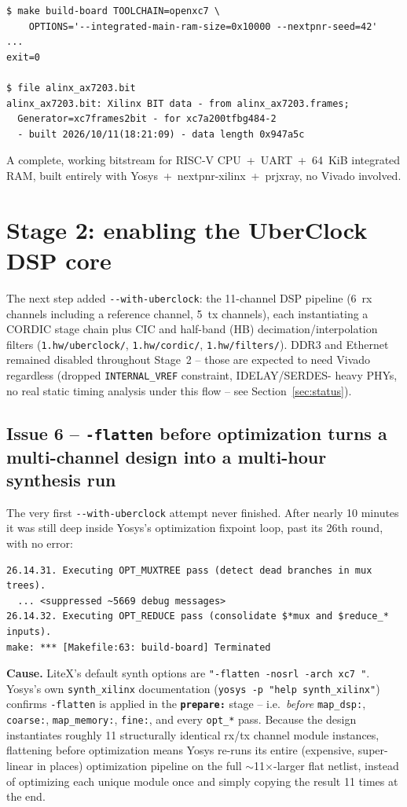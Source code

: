 \documentclass[11pt]{article}
\begin{document}
\begin{lstlisting}[style=termout]
$ make build-board TOOLCHAIN=openxc7 \
    OPTIONS='--integrated-main-ram-size=0x10000 --nextpnr-seed=42'
...
exit=0

$ file alinx_ax7203.bit
alinx_ax7203.bit: Xilinx BIT data - from alinx_ax7203.frames;
  Generator=xc7frames2bit - for xc7a200tfbg484-2
  - built 2026/10/11(18:21:09) - data length 0x947a5c
\end{lstlisting}

A complete, working bitstream for RISC-V CPU~+~UART~+~64~KiB integrated
RAM, built entirely with Yosys~+~nextpnr-xilinx~+~prjxray, no Vivado
involved.

\section{Stage 2: enabling the UberClock DSP core}
\label{sec:stage2}

The next step added \lstinline{--with-uberclock}: the 11-channel DSP
pipeline (6~rx channels including a reference channel, 5~tx channels),
each instantiating a CORDIC stage chain plus CIC and half-band (HB)
decimation/interpolation filters (\lstinline{1.hw/uberclock/},
\lstinline{1.hw/cordic/}, \lstinline{1.hw/filters/}). DDR3 and Ethernet
remained disabled throughout Stage~2 -- those are expected to need Vivado
regardless (dropped \lstinline{INTERNAL_VREF} constraint, IDELAY/SERDES-
heavy PHYs, no real static timing analysis under this flow -- see
Section~\ref{sec:status}).

\subsection{Issue 6 -- \texttt{-flatten} before optimization turns a
multi-channel design into a multi-hour synthesis run}

The very first \lstinline{--with-uberclock} attempt never finished.
After nearly 10 minutes it was still deep inside Yosys's optimization
fixpoint loop, past its 26th round, with no error:
\begin{lstlisting}[style=termout]
26.14.31. Executing OPT_MUXTREE pass (detect dead branches in mux trees).
  ... <suppressed ~5669 debug messages>
26.14.32. Executing OPT_REDUCE pass (consolidate $*mux and $reduce_* inputs).
make: *** [Makefile:63: build-board] Terminated
\end{lstlisting}

\textbf{Cause.} LiteX's default synth options are
\lstinline{"-flatten -nosrl -arch xc7 "}. Yosys's own
\lstinline{synth_xilinx} documentation (\lstinline{yosys -p "help synth_xilinx"}) confirms \lstinline{-flatten} is applied in the
\textbf{\lstinline{prepare:}} stage -- i.e.\ \emph{before}
\lstinline{map_dsp:}, \lstinline{coarse:}, \lstinline{map_memory:},
\lstinline{fine:}, and every \lstinline{opt_*} pass. Because the design
instantiates roughly 11 structurally identical rx/tx channel module
instances, flattening before optimization means Yosys re-runs its entire
(expensive, super-linear in places) optimization pipeline on the full
$\sim$11$\times$-larger flat netlist, instead of optimizing each unique
module once and simply copying the result 11 times at the end.
\end{document}
